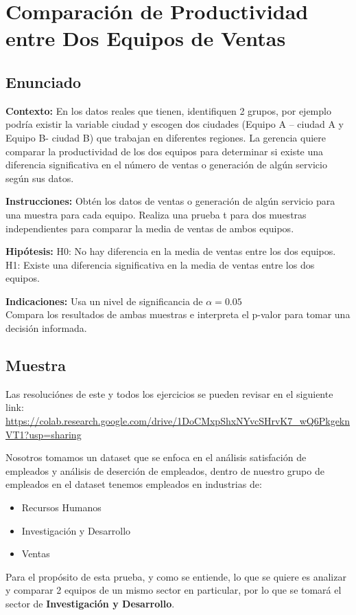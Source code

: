 \newpage
\section{Comparación de Productividad entre Dos Equipos de Ventas}

\subsection{Enunciado}
\textbf{Contexto:}
En los datos reales que tienen, identifiquen 2 grupos, por ejemplo podría existir la variable ciudad y
escogen dos ciudades (Equipo A – ciudad A y Equipo B- ciudad B) que trabajan en diferentes regiones. La gerencia quiere comparar
la productividad de los dos equipos para determinar si existe una diferencia significativa en el número de ventas
o generación de algún servicio según sus datos.

\textbf{Instrucciones:}
Obtén los datos de ventas o generación de algún servicio para una muestra para cada equipo.
Realiza una prueba t para dos muestras independientes para comparar la media de ventas de ambos equipos.

\textbf{Hipótesis:}
H0: No hay diferencia en la media de ventas entre los dos equipos.
H1: Existe una diferencia significativa en la media de ventas entre los dos equipos.

\textbf{Indicaciones:}
Usa un nivel de significancia de \( \alpha = 0.05 \)
\\
Compara los resultados de ambas muestras e interpreta el p-valor para tomar una decisión informada.

\subsection{Muestra}

Las resoluciónes de este y todos los ejercicios se pueden revisar en el siguiente link:
\url{https://colab.research.google.com/drive/1DoCMxpShxNYvcSHrvK7_wQ6PkgeknVT1?usp=sharing}

Nosotros tomamos un dataset que se enfoca en el análisis satisfación de empleados \cite{ibm-hr} y
análisis de deserción de empleados, dentro de nuestro grupo de empleados en el dataset tenemos
empleados en industrias de:
\begin{itemize}
    \item Recursos Humanos
    \item Investigación y Desarrollo
    \item Ventas
\end{itemize}
Para el propósito de esta prueba, y como se entiende, lo que se quiere es analizar y comparar
2 equipos de un mismo sector en particular, por lo que se tomará el sector de
\textbf{Investigación y Desarrollo}.

